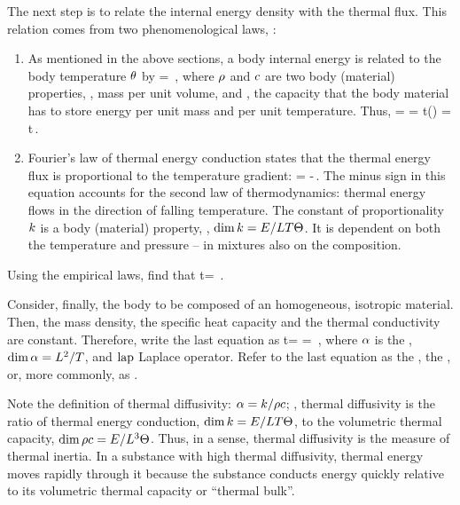 The next step is to relate the internal energy density with the thermal flux. This relation comes from two phenomenological laws, \aka {}:
\begin{enumerate}
\item As mentioned in the above sections, a body internal energy is related to the body temperature $\theta$ by 
\beq
\ien = \dens\kshcap\temp\,,
\eeq
where $\rho$ and $c$ are two body (material) properties, , mass per unit volume, and , the capacity that the body material has to store energy per unit mass and per unit temperature. Thus,
\beq
\rate\ien = \rate{\left(\dens\kshcap\temp\right)}
          = \ipd t\left(\dens\kshcap\temp\right)
          = \ipd t\dens\kshcap\temp\,.
\eeq
%
\item Fourier's law of thermal energy conduction states that the thermal energy flux is proportional to the temperature gradient: 
\beq
\flux\then = -\kthcond\grad\temp\,.
\eeq
The minus sign in this equation accounts for the second law of thermodynamics: thermal energy flows in the direction of falling temperature. The constant of proportionality $k$ is a body (material) property, , $\dim k = E/LT\Theta$. It is dependent on both the temperature and pressure -- in mixtures also on the composition.
\end{enumerate}

Using the empirical laws, find that
\beq
\ipd t\dens\kshcap\temp = \div\kthcond\grad\temp\,.
\eeq

Consider, finally, the body to be composed of an homogeneous, isotropic material. Then, the mass density, the specific heat capacity and the thermal conductivity are constant. Therefore, write the last equation as
\beq
\ipd t\temp = \kthdiff\lap\temp \qquad{}\qquad
\rate\temp = \kthdiff\lap\temp\,,
\eeq
where $\alpha$ is the , $\dim\alpha = L^2/T$, and $\operatorname{lap}$ Laplace operator. Refer to the last equation as the , the , or, more commonly, as .

Note the definition of thermal diffusivity: $\alpha = k/\rho c$; \ie, thermal diffusivity is the ratio of thermal energy conduction, $\dim k = E/LT\Theta$, to the volumetric thermal capacity, $\dim\rho c = E/L^3\Theta$. Thus, in a sense, thermal diffusivity is the measure of thermal inertia. In a substance with high thermal diffusivity, thermal energy moves rapidly through it because the substance conducts energy quickly relative to its volumetric thermal capacity or ``thermal bulk''.



